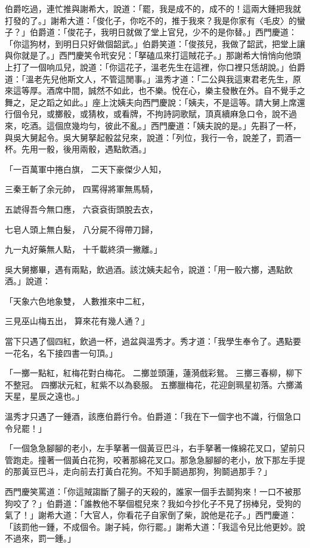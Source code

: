 \begin{showcontents}{}
伯爵吃過，連忙推與謝希大，說道：「罷，我是成不的，成不的！這兩大鍾把我就打發的了。」謝希大道：「俊化子，你吃不的，推于我來？我是你家有〈毛皮〉的蠻子？」伯爵道：「俊花子，我明日就做了堂上官兒，少不的是你替。」西門慶道：「你這狗材，到明日只好做個韶武。」伯爵笑道：「俊孩兒，我做了韶武，把堂上讓與你就是了。」西門慶笑令玳安兒：「拏磕瓜來打這賊花子。」那謝希大悄悄向他頭上打了一個响瓜兒，說道：「你這花子，溫老先生在這裡，你口裡只恁胡說。」伯爵道：「溫老先兒他斯文人，不管這閒事。」溫秀才道：「二公與我這東君老先生，原來這等厚。酒席中間，誠然不如此，也不樂。悅在心，樂主發散在外。自不覺手之舞之，足之蹈之如此。」座上沈姨夫向西門慶說：「姨夫，不是這等。請大舅上席還行個令兒，或擲骰，或猜枚，或看牌，不拘詩詞歌賦，頂真續麻急口令，說不過來，吃酒。這個庶幾均勻，彼此不亂。」西門慶道：「姨夫說的是。」先斟了一杯，與吳大舅起令。吳大舅拏起骰盆兒來，說道：「列位，我行一令，說差了，罰酒一杯。先用一骰，後用兩骰，遇點飲酒。」

「一百萬軍中捲白旗，  二天下豪傑少人知，

三秦王斬了余元帥，  四罵得將軍無馬騎，

五諕得吾今無口應，  六袞袞街頭脫去衣，

七皂人頭上無白髮，  八分屍不得帶刀歸，

九一丸好藥無人點，  十千載終須一撇離。」

吳大舅擲畢，遇有兩點，飲過酒。該沈姨夫起令，說道：「用一骰六擲，遇點飲酒。」說道：

「天象六色地象雙，  人數推來中二紅，

三見巫山梅五出，  算來花有幾人通？」

當下只遇了個四紅，飲過一杯，過盆與溫秀才。秀才道：「我學生奉令了。遇點要一花名，名下接四書一句頂。」

「一擲一點紅，紅梅花對白梅花。  二擲並頭蓮，蓮漪戲彩鴛。  三擲三春柳，柳下不整冠。  四擲狀元紅，紅紫不以為褻服。  五擲臘梅花，花迎劍珮星初落。六擲滿天星，星辰之遠也。」

溫秀才只遇了一鍾酒，該應伯爵行令。伯爵道：「我在下一個字也不識，行個急口令兒罷！」

「一個急急腳腳的老小，左手拏著一個黃豆巴斗，右手拏著一條綿花叉口，望前只管跑走。撞著一個黃白花狗，咬著那綿花叉口。那急急腳腳的老小，放下那左手提的那黃豆巴斗，走向前去打黃白花狗。不知手鬬過那狗，狗鬬過那手？」

西門慶笑罵道：「你這賊謅斷了腸子的天殺的，誰家一個手去鬬狗來！一口不被那狗咬了？」伯爵道：「誰教他不拏個棍兒來？我如今抄化子不見了拐棒兒，受狗的氣了！」謝希大道：「大官人，你看花子自家倒了柴，說他是花子。」西門慶道：「該罰他一鍾，不成個令。謝子純，你行罷。」謝希大道：「我這令兒比他更妙。說不過來，罰一鍾。」


\end{showcontents}
